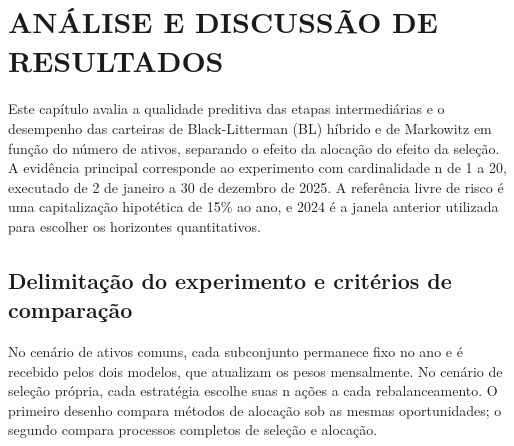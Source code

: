 \chapter{ANÁLISE E DISCUSSÃO DE RESULTADOS}
\label{cap:resultados}
\renewcommand{\thetable}{\thechapter.\arabic{table}}
\renewcommand{\thefigure}{\thechapter.\arabic{figure}}
\setcounter{table}{0}\setcounter{figure}{0}
Este capítulo avalia a qualidade preditiva das etapas intermediárias e o desempenho das carteiras de Black-Litterman (BL) híbrido e de Markowitz em função do número de ativos, separando o efeito da alocação do efeito da seleção. A evidência principal corresponde ao experimento com cardinalidade n de 1 a 20, executado de 2 de janeiro a 30 de dezembro de 2025. A referência livre de risco é uma capitalização hipotética de 15\% ao ano, e 2024 é a janela anterior utilizada para escolher os horizontes quantitativos.

\section{Delimitação do experimento e critérios de comparação}
No cenário de ativos comuns, cada subconjunto permanece fixo no ano e é recebido pelos dois modelos, que atualizam os pesos mensalmente. No cenário de seleção própria, cada estratégia escolhe suas n ações a cada rebalanceamento. O primeiro desenho compara métodos de alocação sob as mesmas oportunidades; o segundo compara processos completos de seleção e alocação.

